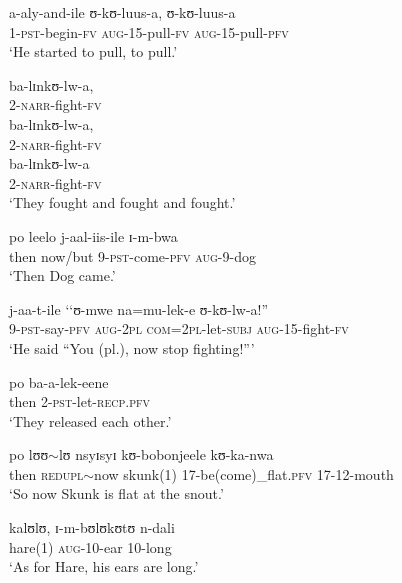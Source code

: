 \begin{exe}
\ex \gll a-aly-and-ile ʊ-kʊ-luus-a, ʊ-kʊ-luus-a\\
1-\textsc{pst}-begin-\textsc{fv} \textsc{aug}-15-pull-\textsc{fv} \textsc{aug}-15-pull-\textsc{pfv}\\
\glt \lq He started to pull, to pull.'

\ex \gll ba-lɪnkʊ-lw-a,\\
2-\textsc{narr}-fight-\textsc{fv}\\

\ex \gll ba-lɪnkʊ-lw-a,\\
2-\textsc{narr}-fight-\textsc{fv}\\

\ex \gll ba-lɪnkʊ-lw-a\\
2-\textsc{narr}-fight-\textsc{fv}\\
\glt \lq They fought and fought and fought.'

\ex \gll po leelo j-aal-iis-ile ɪ-m-bwa\\
then now/but 9-\textsc{pst}-come-\textsc{pfv} \textsc{aug}-9-dog\\
\glt \lq Then Dog came.'

\ex \gll j-aa-t-ile \lq\lq ʊ-mwe na=mu-lek-e ʊ-kʊ-lw-a!''\\
9-\textsc{pst}-say-\textsc{pfv} \phantom{\lq\lq}\textsc{aug}-\textsc{2pl} \textsc{com}=\textsc{2pl}-let-\textsc{subj} \textsc{aug}-15-fight-\textsc{fv}\\
\glt \lq He said ``You (pl.), now stop fighting!''{}'

\ex \gll po ba-a-lek-eene\\
then 2-\textsc{pst}-let-\textsc{recp.pfv}\\
\glt \lq They released each other.'

\ex \gll po lʊʊ$\sim$lʊ nsyɪsyɪ kʊ-bobonjeele kʊ-ka-nwa\\
then \textsc{redupl}$\sim$now skunk(1) 17-be(come)\_flat.\textsc{pfv} 17-12-mouth\\
\glt \lq So now Skunk is flat at the snout.'

\ex \gll kalʊlʊ, ɪ-m-bʊlʊkʊtʊ n-dali\\
hare(1) \textsc{aug}-10-ear 10-long\\
\glt \lq As for Hare, his ears are long.'
\end{exe} %

